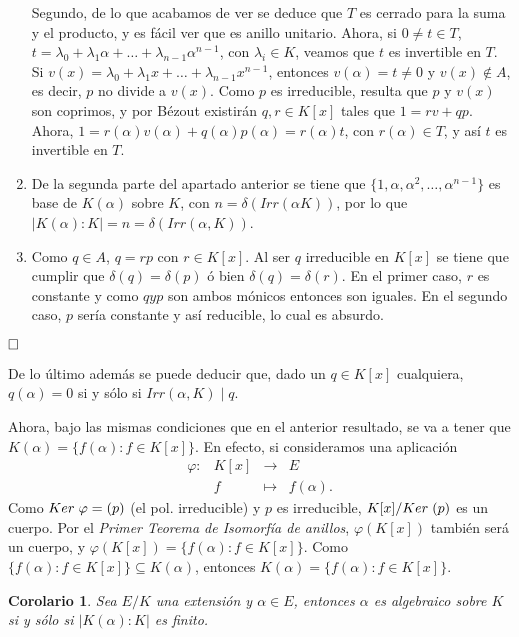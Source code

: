 \documentclass[12pt]{article}
\newtheorem{corolario}{Corolario}[theorem]
\begin{document}
\begin{enumerate}
Segundo, de lo que acabamos de ver se deduce que $T$ es cerrado para la suma y el producto, y es fácil ver que es anillo unitario. Ahora, si $0 \neq t \in T$, $t = \lambda_{0} + \lambda_{1} \alpha + \ldots + \lambda_{n-1} \alpha^{n-1}$, con $\lambda_{i} \in K$, veamos que $t$ es invertible en $T$. Si $v(x) = \lambda_{0} + \lambda_{1} x + \ldots + \lambda_{n-1} x^{n-1}$, entonces $v(\alpha) = t \neq 0$ y $v(x) \notin A$, es decir, $p$ no divide a $v(x)$. Como $p$ es irreducible, resulta que $p$ y $v(x)$ son coprimos, y por Bézout existirán $q,r \in K[x]$ tales que $1 = rv + qp$. Ahora, $1 = r(\alpha)v(\alpha) + q(\alpha) p(\alpha) = r(\alpha) t$, con $r(\alpha) \in T$, y así $t$ es invertible en $T$.
\item De la segunda parte del apartado anterior se tiene que $\lbrace 1, \alpha, \alpha^{2}, \ldots, \alpha^{n-1} \rbrace$ es base de $K(\alpha)$ sobre $K$, con $n = \delta (Irr(\alpha K))$, por lo que $|K(\alpha) : K| = n = \delta (Irr(\alpha, K))$. 
\item Como $q \in A$, $q = rp$ con $r \in K[x]$. Al ser $q$ irreducible en $K[x]$ se tiene que cumplir que $\delta (q) = \delta (p)$ ó bien $\delta (q) = \delta (r)$. En el primer caso, $r$ es constante y como $q y p$ son ambos mónicos entonces son iguales. En el segundo caso, $p$ sería constante y así reducible, lo cual es absurdo.
\end{enumerate}

$\hfill \square$

De lo último además se puede deducir que, dado un $q \in K[x]$ cualquiera, $q(\alpha) = 0$ si y sólo si $Irr(\alpha, K) \mid q.$


Ahora, bajo las mismas condiciones que en el anterior resultado, se va a tener que $K(\alpha) = \lbrace f(\alpha) : f \in K[x] \rbrace$. En efecto, si consideramos una aplicación $$\begin{array}{rccl}
\varphi \colon &K[x]&\longrightarrow &E \\
&f& \longmapsto &f(\alpha).
\end{array}
$$ Como $Ker \hspace{0.1cm} \varphi = (p)$ (el pol. irreducible) y $p$ es irreducible, $K[x]/Ker \hspace{0.1cm} (p)$ es un cuerpo. Por el \textit{Primer Teorema de Isomorfía de anillos}, $\varphi (K[x])$ también será un cuerpo, y $\varphi(K[x]) = \lbrace f(\alpha) :f \in K[x] \rbrace.$ Como $\lbrace f(\alpha) : f \in K[x] \rbrace \subseteq K(\alpha)$, entonces $K(\alpha) = \lbrace f(\alpha) : f \in K[x] \rbrace$.
\begin{corolario}\label{eq:cor1} Sea $E/K$ una extensión y $\alpha \in E$, entonces $\alpha$ es algebraico sobre $K$ si y sólo si $|K(\alpha) : K|$ es finito.
\end{corolario}
\end{document}
